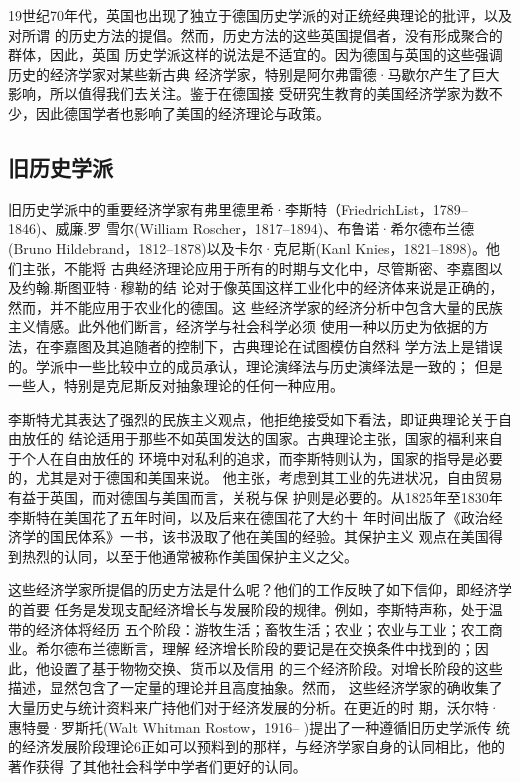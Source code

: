 19世纪70年代，英国也出现了独立于德国历史学派的对正统经典理论的批评，以及对所谓
的历史方法的提倡。然而，历史方法的这些英国提倡者，没有形成聚合的群体，因此，英国
历史学派这样的说法是不适宜的。因为德国与英国的这些强调历史的经济学家对某些新古典
经济学家，特别是阿尔弗雷德·马歇尔产生了巨大影响，所以值得我们去关注。鉴于在德国接
受研究生教育的美国经济学家为数不少，因此德国学者也影响了美国的经济理论与政策。

\subsection{旧历史学派}

旧历史学派中的重要经济学家有弗里德里希·李斯特（FriedrichList，1789--1846)、威廉.罗
雪尔(William Roscher，1817--1894)、布鲁诺·希尔德布兰德(Bruno
Hildebrand，1812--1878)以及卡尔·克尼斯(Kanl Knies，1821--1898)。他们主张，不能将
古典经济理论应用于所有的时期与文化中，尽管斯密、李嘉图以及约翰.斯图亚特·穆勒的结
论对于像英国这样工业化中的经济体来说是正确的，然而，并不能应用于农业化的德国。这
些经济学家的经济分析中包含大量的民族主义情感。此外他们断言，经济学与社会科学必须
使用一种以历史为依据的方法，在李嘉图及其追随者的控制下，古典理论在试图模仿自然科
学方法上是错误的。学派中一些比较中立的成员承认，理论演绎法与历史演绎法是一致的；
但是一些人，特别是克尼斯反对抽象理论的任何一种应用。

李斯特尤其表达了强烈的民族主义观点，他拒绝接受如下看法，即证典理论关于自由放任的
结论适用于那些不如英国发达的国家。古典理论主张，国家的福利来自于个人在自由放任的
环境中对私利的追求，而李斯特则认为，国家的指导是必要的，尤其是对于德国和美国来说。
他主张，考虑到其工业的先进状况，自由贸易有益于英国，而对德国与美国而言，关税与保
护则是必要的。从1825年至1830年李斯特在美国花了五年时间，以及后来在德国花了大约十
年时间出版了《政治经济学的国民体系》一书，该书汲取了他在美国的经验。其保护主义
观点在美国得到热烈的认同，以至于他通常被称作美国保护主义之父。

这些经济学家所提倡的历史方法是什么呢？他们的工作反映了如下信仰，即经济学的首要
任务是发现支配经济增长与发展阶段的规律。例如，李斯特声称，处于温带的经济体将经历
五个阶段：游牧生活；畜牧生活；农业；农业与工业；农工商业。希尔德布兰德断言，理解
经济增长阶段的要记是在交换条件中找到的；因此，他设置了基于物物交换、货币以及信用
的三个经济阶段。对增长阶段的这些描述，显然包含了一定量的理论并且高度抽象。然而，
这些经济学家的确收集了大量历史与统计资料来广持他们对于经济发展的分析。在更近的时
期，沃尔特·惠特曼·罗斯托(Walt Whitman Rostow，1916-- )提出了一种遵循旧历史学派传
统的经济发展阶段理论6正如可以预料到的那样，与经济学家自身的认同相比，他的著作获得
了其他社会科学中学者们更好的认同。

